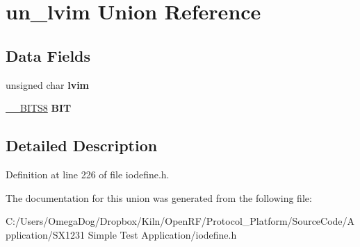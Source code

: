 \hypertarget{unionun__lvim}{\section{un\-\_\-lvim Union Reference}
\label{unionun__lvim}
}
\subsection*{Data Fields}
\begin{DoxyCompactItemize}
\item 
\hypertarget{unionun__lvim_a9ed34bbf1dd60ccbaa7143d770e421b7}{unsigned char {\bfseries lvim}}\label{unionun__lvim_a9ed34bbf1dd60ccbaa7143d770e421b7}

\item 
\hypertarget{unionun__lvim_a036c5e3718180e2741f05659d477ce68}{\hyperlink{struct_____b_i_t_s8}{\-\_\-\-\_\-\-B\-I\-T\-S8} {\bfseries B\-I\-T}}\label{unionun__lvim_a036c5e3718180e2741f05659d477ce68}

\end{DoxyCompactItemize}


\subsection{Detailed Description}


Definition at line 226 of file iodefine.\-h.



The documentation for this union was generated from the following file\-:\begin{DoxyCompactItemize}
\item 
C\-:/\-Users/\-Omega\-Dog/\-Dropbox/\-Kiln/\-Open\-R\-F/\-Protocol\-\_\-\-Platform/\-Source\-Code/\-Application/\-S\-X1231 Simple Test Application/iodefine.\-h\end{DoxyCompactItemize}
